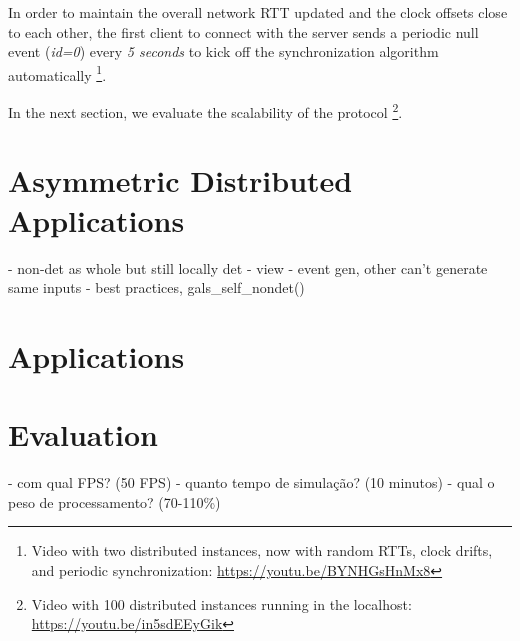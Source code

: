 \documentclass[sigplan,screen]{acmart}
\begin{document}
In order to maintain the overall network RTT updated and the clock offsets
close to each other, the first client to connect with the server sends a
periodic null event (\emph{id=0}) every \emph{5 seconds} to kick off the
synchronization algorithm automatically%
\footnote {
    Video with two distributed instances, now with random RTTs, clock drifts,
    and periodic synchronization:
    \url{https://youtu.be/BYNHGsHnMx8}
}.


In the next section, we evaluate the scalability of the protocol%
\footnote {
    Video with 100 distributed instances running in the localhost:
    \url{https://youtu.be/in5sdEEyGik}
}.

\section{Asymmetric Distributed Applications}

- non-det as whole but still locally det
- view
- event gen, other can't generate same inputs
- best practices, gals_self_nondet()

\section{Applications}
\label{sec.apps}

\section{Evaluation}
\label{sec.eval}

- com qual FPS? (50 FPS)
- quanto tempo de simulação? (10 minutos)
- qual o peso de processamento? (70-110\%)
\end{document}
